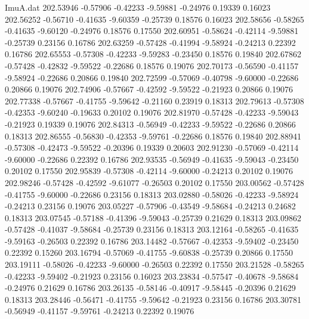 \begin{filecontents}{ImuA.dat}
 202.53946   -0.57906   -0.42233   -9.59881   -0.24976    0.19339    0.16023
 202.56252   -0.56710   -0.41635   -9.60359   -0.25739    0.18576    0.16023
 202.58656   -0.58265   -0.41635   -9.60120   -0.24976    0.18576    0.17550
 202.60951   -0.58624   -0.42114   -9.59881   -0.25739    0.23156    0.16786
 202.63259   -0.57428   -0.41994   -9.58924   -0.24213    0.22392    0.16786
 202.65553   -0.57308   -0.42233   -9.59283   -0.23450    0.18576    0.19840
 202.67862   -0.57428   -0.42832   -9.59522   -0.22686    0.18576    0.19076
 202.70173   -0.56590   -0.41157   -9.58924   -0.22686    0.20866    0.19840
 202.72599   -0.57069   -0.40798   -9.60000   -0.22686    0.20866    0.19076
 202.74906   -0.57667   -0.42592   -9.59522   -0.21923    0.20866    0.19076
 202.77338   -0.57667   -0.41755   -9.59642   -0.21160    0.23919    0.18313
 202.79613   -0.57308   -0.42353   -9.60240   -0.19633    0.20102    0.19076
 202.81970   -0.57428   -0.42233   -9.59043   -0.21923    0.19339    0.19076
 202.84313   -0.56949   -0.42233   -9.59522   -0.22686    0.20866    0.18313
 202.86555   -0.56830   -0.42353   -9.59761   -0.22686    0.18576    0.19840
 202.88941   -0.57308   -0.42473   -9.59522   -0.20396    0.19339    0.20603
 202.91230   -0.57069   -0.42114   -9.60000   -0.22686    0.22392    0.16786
 202.93535   -0.56949   -0.41635   -9.59043   -0.23450    0.20102    0.17550
 202.95839   -0.57308   -0.42114   -9.60000   -0.24213    0.20102    0.19076
 202.98246   -0.57428   -0.42592   -9.61077   -0.26503    0.20102    0.17550
 203.00562   -0.57428   -0.41755   -9.60000   -0.22686    0.23156    0.18313
 203.02880   -0.58026   -0.42233   -9.58924   -0.24213    0.23156    0.19076
 203.05227   -0.57906   -0.43549   -9.58684   -0.24213    0.24682    0.18313
 203.07545   -0.57188   -0.41396   -9.59043   -0.25739    0.21629    0.18313
 203.09862   -0.57428   -0.41037   -9.58684   -0.25739    0.23156    0.18313
 203.12164   -0.58265   -0.41635   -9.59163   -0.26503    0.22392    0.16786
 203.14482   -0.57667   -0.42353   -9.59402   -0.23450    0.22392    0.15260
 203.16794   -0.57069   -0.41755   -9.60838   -0.25739    0.20866    0.17550
 203.19111   -0.58026   -0.42233   -9.60000   -0.26503    0.22392    0.17550
 203.21528   -0.58265   -0.42233   -9.59402   -0.21923    0.23156    0.16023
 203.23834   -0.57547   -0.40678   -9.58684   -0.24976    0.21629    0.16786
 203.26135   -0.58146   -0.40917   -9.58445   -0.20396    0.21629    0.18313
 203.28446   -0.56471   -0.41755   -9.59642   -0.21923    0.23156    0.16786
 203.30781   -0.56949   -0.41157   -9.59761   -0.24213    0.22392    0.19076

\end{filecontents}
